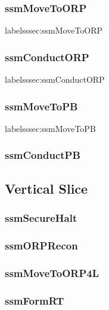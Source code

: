 \documentclass[../../main/main.tex]{subfiles}
\begin{document}
\subsubsection{ssmMoveToORP}label{sssec:ssmMoveToORP}

\subsubsection{ssmConductORP}label{sssec:ssmConductORP}

\subsubsection{ssmMoveToPB}label{sssec:ssmMoveToPB}

\subsubsection{ssmConductPB}\label{sssec:ssmConductPB}

\subsection{Vertical Slice}\label{ssec:verticalslice}

\subsubsection{ssmSecureHalt}\label{sssec:ssmSecureHalt}

\subsubsection{ssmORPRecon}\label{sssec:ssmORPRecon}

\subsubsection{ssmMoveToORP4L}\label{sssec:ssmMoveToORP4L}

\subsubsection{ssmFormRT}\label{sssec:ssmFormRT}
\end{document}
